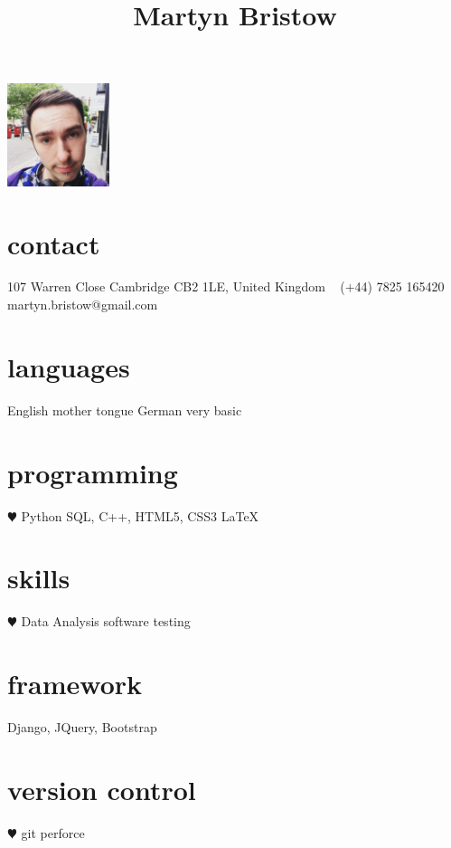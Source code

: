 \documentclass[]{cv-style}          %
\begin{document}
\lastupdated
\title{Martyn Bristow}

\begin{aside}
%
\includegraphics[width=3cm]{martyn.jpg}
\section{contact}
107 Warren Close
\hspace*{25pt} Cambridge
\hspace*{25pt} CB2 1LE, 
\hspace*{25pt} United Kingdom
~
(+44) 7825 165420
~
martyn.bristow@gmail.com
%
\section{languages}
English mother tongue
German very basic
%
\section{programming}
{\color{red} $\varheartsuit$} Python
SQL, C++,
HTML5, CSS3
\LaTeX{}
\section{skills}
{\color{red} $\varheartsuit$} Data Analysis
software testing
\section{framework}
Django, JQuery, Bootstrap
\section{version control}
{\color{red} $\varheartsuit$} git
perforce
%
\end{aside}

\end{document}
